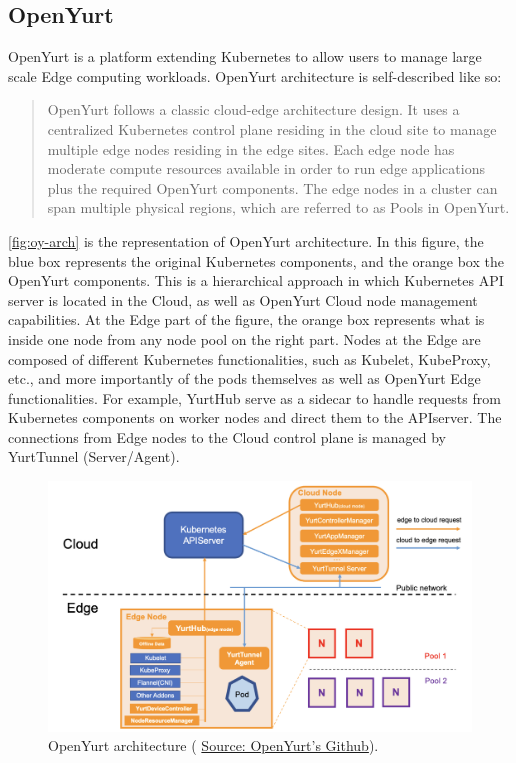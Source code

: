\subsection{OpenYurt~\cite{openyurt}}
\label{subsec:oy}
OpenYurt is a platform extending Kubernetes to allow users to manage
large scale Edge computing workloads.
%
OpenYurt architecture is self-described like so:
\begin{quote}
  OpenYurt follows a classic cloud-edge architecture design. It uses a
  centralized Kubernetes control plane residing in the cloud site to
  manage multiple edge nodes residing in the edge sites. Each edge
  node has moderate compute resources available in order to run edge
  applications plus the required OpenYurt components. The edge nodes
  in a cluster can span multiple physical regions, which are referred
  to as Pools in OpenYurt.
\end{quote}

\autoref{fig:oy-arch} is the representation of OpenYurt architecture.
%
In this figure, the blue box represents the original Kubernetes
components, and the orange box the OpenYurt components.
%
This is a hierarchical approach in which Kubernetes \acrshort{API}
server is located in the Cloud, as well as OpenYurt Cloud node
management capabilities.
%
At the Edge part of the figure, the orange box represents what is
inside one node from any node pool on the right part.
%
Nodes at the Edge are composed of different Kubernetes
functionalities, such as Kubelet, KubeProxy, etc., and more
importantly of the pods themselves as well as OpenYurt Edge
functionalities.
%
For example, YurtHub serve as a sidecar to handle requests from
Kubernetes components on worker nodes and direct them to the
APIserver.
%
The connections from Edge nodes to the Cloud control plane is managed
by YurtTunnel (Server/Agent).


\begin{figure}[htbp]
  \centering  \includegraphics[width=.9\linewidth]{figs/png/openyurt-arch}
  \caption{OpenYurt architecture ( \href{https://github.com/openyurtio/openyurt}{Source: OpenYurt's Github}).}
  \label{fig:oy-arch}
\end{figure}

